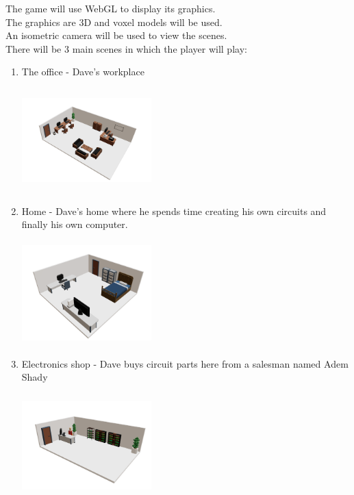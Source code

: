 \documentclass[12pt]{article}
\begin{document}
The game will use WebGL to display its graphics.\\
The graphics are 3D and voxel models will be used.\\
An isometric camera will be used to view the scenes.\\
There will be 3 main scenes in which the player will play:\\
\begin{enumerate}
    \item The office - Dave's workplace
          \begin{center}
              \includegraphics[width=5cm, height=4cm]{office.png}
          \end{center}
          \pagebreak
    \item Home - Dave's home where he spends time creating his own circuits and finally his own computer.
          \begin{center}
              \includegraphics[width=5cm, height=4cm]{home.png}
          \end{center}
    \item Electronics shop - Dave buys circuit parts here from a salesman named Adem Shady
          \begin{center}
              \includegraphics[width=5cm, height=4cm]{shop.jpeg}
          \end{center}
\end{enumerate}
\end{document}

